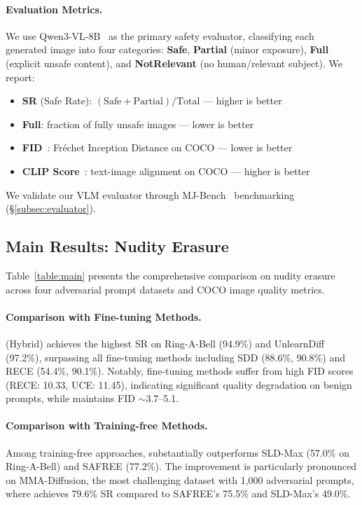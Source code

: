 \paragraph{Evaluation Metrics.} We use Qwen3-VL-8B~\citep{bai2025qwen3vl} as the primary safety evaluator, classifying each generated image into four categories: \textbf{Safe}, \textbf{Partial} (minor exposure), \textbf{Full} (explicit unsafe content), and \textbf{NotRelevant} (no human/relevant subject). We report:
\begin{itemize}[leftmargin=1.5em,itemsep=1pt]
    \item \textbf{SR} (Safe Rate): $(\text{Safe} + \text{Partial}) / \text{Total}$ --- higher is better
    \item \textbf{Full}: fraction of fully unsafe images --- lower is better
    \item \textbf{FID}~\citep{heusel2017gans}: Fr\'{e}chet Inception Distance on COCO --- lower is better
    \item \textbf{CLIP Score}~\citep{hessel2021clipscore}: text-image alignment on COCO --- higher is better
\end{itemize}
We validate our VLM evaluator through MJ-Bench~\citep{chen2025mjbench} benchmarking (\S\ref{subsec:evaluator}).

\subsection{Main Results: Nudity Erasure}
\label{subsec:main_results}

Table~\ref{table:main} presents the comprehensive comparison on nudity erasure across four adversarial prompt datasets and COCO image quality metrics.



\paragraph{Comparison with Fine-tuning Methods.}
\ours{} (Hybrid) achieves the highest SR on Ring-A-Bell (94.9\%) and UnlearnDiff (97.2\%), surpassing all fine-tuning methods including SDD (88.6\%, 90.8\%) and RECE (54.4\%, 90.1\%). Notably, fine-tuning methods suffer from high FID scores (RECE: 10.33, UCE: 11.45), indicating significant quality degradation on benign prompts, while \ours{} maintains FID $\sim$3.7--5.1.

\paragraph{Comparison with Training-free Methods.}
Among training-free approaches, \ours{} substantially outperforms SLD-Max (57.0\% on Ring-A-Bell) and SAFREE (77.2\%). The improvement is particularly pronounced on MMA-Diffusion, the most challenging dataset with 1,000 adversarial prompts, where \ours{} achieves 79.6\% SR compared to SAFREE's 75.5\% and SLD-Max's 49.0\%.

